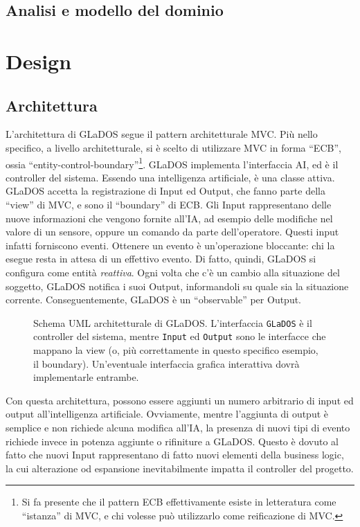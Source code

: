 \documentclass[a4paper,12pt]{report}
\begin{document}
\section{Analisi e modello del dominio}


\chapter{Design}

\section{Architettura}

L'architettura di GLaDOS segue il pattern architetturale MVC.
%
Più nello specifico, a livello architetturale, si è scelto di utilizzare MVC in forma ``ECB'', ossia ``entity-control-boundary''\footnote{
Si fa presente che il pattern ECB effettivamente esiste in letteratura come ``istanza'' di MVC, e chi volesse può utilizzarlo come reificazione di MVC.
}.
%
GLaDOS implementa l'interfaccia AI, ed è il controller del sistema.
Essendo una intelligenza artificiale, è una classe attiva.
%
GLaDOS accetta la registrazione di Input ed Output, che fanno parte della ``view'' di MVC, e sono il ``boundary'' di ECB.
Gli Input rappresentano delle nuove informazioni che vengono fornite all'IA, ad esempio delle modifiche nel valore di un sensore, oppure un comando da parte dell'operatore.
Questi input infatti forniscono eventi.
Ottenere un evento è un'operazione bloccante: chi la esegue resta in attesa di un effettivo evento.
Di fatto, quindi, GLaDOS si configura come entità \textit{reattiva}.
Ogni volta che c'è un cambio alla situazione del soggetto, GLaDOS notifica i suoi Output,
informandoli su quale sia la situazione corrente.
%
Conseguentemente, GLaDOS è un ``observable'' per Output.

\begin{figure}[h]
\centering{}
\caption{Schema UML architetturale di GLaDOS. L'interfaccia \texttt{GLaDOS} è il controller del sistema, mentre \texttt{Input} ed \texttt{Output} sono le interfacce che mappano la view (o, più correttamente in questo specifico esempio, il boundary). Un'eventuale interfaccia grafica interattiva dovrà implementarle entrambe.}
\label{img:goodarch}
\end{figure}

Con questa architettura, possono essere aggiunti un numero arbitrario di input ed output
all'intelligenza artificiale.
%
Ovviamente, mentre l'aggiunta di output è semplice e non richiede alcuna modifica all'IA, la
presenza di nuovi tipi di evento richiede invece in potenza aggiunte o rifiniture a GLaDOS.
%
Questo è dovuto al fatto che nuovi Input rappresentano di fatto nuovi elementi della business
logic, la cui alterazione od espansione inevitabilmente impatta il controller del progetto.
\end{document}
